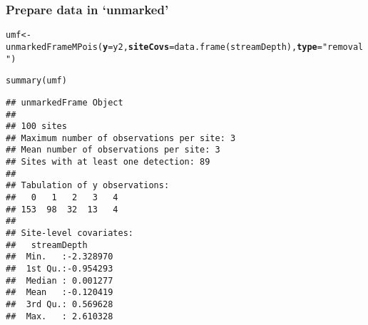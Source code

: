 \documentclass[color=usenames,dvipsnames]{beamer}\usepackage[]{graphicx}\usepackage[]{xcolor}
\makeatletter
\newcommand{\hlsng}[1]{\textcolor[rgb]{0.749,0.012,0.012}{#1}}%
\newcommand{\hldef}[1]{\textcolor[rgb]{0,0,0}{#1}}%
\newcommand{\hlkwb}[1]{\textcolor[rgb]{0,0.341,0.682}{#1}}%
\newcommand{\hlkwc}[1]{\textcolor[rgb]{0,0,0}{\textbf{#1}}}%
\newcommand{\hlkwd}[1]{\textcolor[rgb]{0.004,0.004,0.506}{#1}}%
\newenvironment{kframe}{%
 \def\at@end@of@kframe{}%
 \ifinner\ifhmode%
  \def\at@end@of@kframe{\end{minipage}}%
  \begin{minipage}{\columnwidth}%
 \fi\fi%
 \def\FrameCommand##1{\hskip\@totalleftmargin \hskip-\fboxsep
 \colorbox{shadecolor}{##1}\hskip-\fboxsep
     \hskip-\linewidth \hskip-\@totalleftmargin \hskip\columnwidth}%
 \MakeFramed {\advance\hsize-\width
   \@totalleftmargin\z@ \linewidth\hsize
   \@setminipage}}%
 {\par\unskip\endMakeFramed%
 \at@end@of@kframe}
\newenvironment{knitrout}{}{} %
\makeatother
\begin{document}









\begin{frame}[fragile]
  \frametitle{Prepare data in `unmarked'}
  \small
\begin{knitrout}\tiny
{}\color{fgcolor}\begin{kframe}
\begin{alltt}
\hldef{umf} \hlkwb{<-} \hlkwd{unmarkedFrameMPois}\hldef{(}\hlkwc{y}\hldef{=y2,} \hlkwc{siteCovs}\hldef{=}\hlkwd{data.frame}\hldef{(streamDepth),} \hlkwc{type}\hldef{=}\hlsng{"removal"}\hldef{)}
\end{alltt}
\end{kframe}
\end{knitrout}
\pause
\begin{knitrout}\scriptsize
{}\color{fgcolor}\begin{kframe}
\begin{alltt}
\hlkwd{summary}\hldef{(umf)}
\end{alltt}
\begin{verbatim}
## unmarkedFrame Object
## 
## 100 sites
## Maximum number of observations per site: 3 
## Mean number of observations per site: 3 
## Sites with at least one detection: 89 
## 
## Tabulation of y observations:
##   0   1   2   3   4 
## 153  98  32  13   4 
## 
## Site-level covariates:
##   streamDepth       
##  Min.   :-2.328970  
##  1st Qu.:-0.954293  
##  Median : 0.001277  
##  Mean   :-0.120419  
##  3rd Qu.: 0.569628  
##  Max.   : 2.610328
\end{verbatim}
\end{kframe}
\end{knitrout}
\end{frame}



\end{document}
